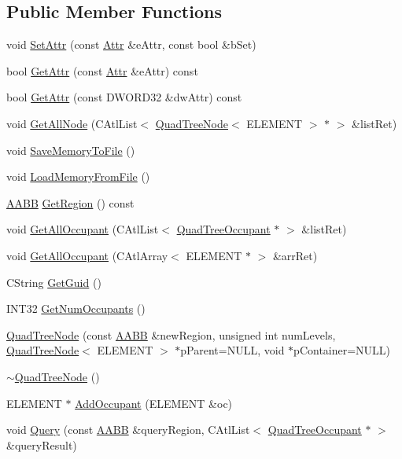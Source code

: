 \subsection*{Public Member Functions}
\begin{DoxyCompactItemize}
\item 
void \hyperlink{class_quad_tree_node_a94e900e876d3b844f61657cce153de4a}{Set\+Attr} (const \hyperlink{class_quad_tree_node_a3d05d6eac38b764cdab142e22b5bebec}{Attr} \&e\+Attr, const bool \&b\+Set)
\item 
bool \hyperlink{class_quad_tree_node_ac76f1f1e8c262afb6ceb3cf3568e5ad7}{Get\+Attr} (const \hyperlink{class_quad_tree_node_a3d05d6eac38b764cdab142e22b5bebec}{Attr} \&e\+Attr) const 
\item 
bool \hyperlink{class_quad_tree_node_afc9374ee0482881dd1e1fa7347cda351}{Get\+Attr} (const D\+W\+O\+R\+D32 \&dw\+Attr) const 
\item 
void \hyperlink{class_quad_tree_node_a99a761d6f51fbcafd3d871bd0c38eb00}{Get\+All\+Node} (C\+Atl\+List$<$ \hyperlink{class_quad_tree_node}{Quad\+Tree\+Node}$<$ E\+L\+E\+M\+E\+N\+T $>$ $\ast$ $>$ \&list\+Ret)
\item 
void \hyperlink{class_quad_tree_node_adab977039e29f4405b623dda1c308ccc}{Save\+Memory\+To\+File} ()
\item 
void \hyperlink{class_quad_tree_node_a52a45a51b0cebb3753ac34aa4e93eb7a}{Load\+Memory\+From\+File} ()
\item 
\hyperlink{struct_a_a_b_b}{A\+A\+B\+B} \hyperlink{class_quad_tree_node_a3004dafd42b7a3a9315b1edcf6b5abaa}{Get\+Region} () const 
\item 
void \hyperlink{class_quad_tree_node_abca45c9fb2efd90c08951e5198621375}{Get\+All\+Occupant} (C\+Atl\+List$<$ \hyperlink{class_quad_tree_occupant}{Quad\+Tree\+Occupant} $\ast$ $>$ \&list\+Ret)
\item 
void \hyperlink{class_quad_tree_node_ab57035da8150c27ea47c701bff3579fd}{Get\+All\+Occupant} (C\+Atl\+Array$<$ E\+L\+E\+M\+E\+N\+T $\ast$ $>$ \&arr\+Ret)
\item 
C\+String \hyperlink{class_quad_tree_node_ad8cbe9dbac917167074683014161b961}{Get\+Guid} ()
\item 
I\+N\+T32 \hyperlink{class_quad_tree_node_aa9b193475c774e36ed98ce9a8fa29c9d}{Get\+Num\+Occupants} ()
\item 
\hyperlink{class_quad_tree_node_ab072e5f45aca142b422ae5678a74717b}{Quad\+Tree\+Node} (const \hyperlink{struct_a_a_b_b}{A\+A\+B\+B} \&new\+Region, unsigned int num\+Levels, \hyperlink{class_quad_tree_node}{Quad\+Tree\+Node}$<$ E\+L\+E\+M\+E\+N\+T $>$ $\ast$p\+Parent=N\+U\+L\+L, void $\ast$p\+Container=N\+U\+L\+L)
\item 
\hyperlink{class_quad_tree_node_a5cf1fc36f4b9e5766a943e62f7bf6803}{$\sim$\+Quad\+Tree\+Node} ()
\item 
E\+L\+E\+M\+E\+N\+T $\ast$ \hyperlink{class_quad_tree_node_a4d5696710ee2af77c847971138c492eb}{Add\+Occupant} (E\+L\+E\+M\+E\+N\+T \&oc)
\item 
void \hyperlink{class_quad_tree_node_afc2931a97dabe0298f5be44d99d082eb}{Query} (const \hyperlink{struct_a_a_b_b}{A\+A\+B\+B} \&query\+Region, C\+Atl\+List$<$ \hyperlink{class_quad_tree_occupant}{Quad\+Tree\+Occupant} $\ast$ $>$ \&query\+Result)
\end{DoxyCompactItemize}
